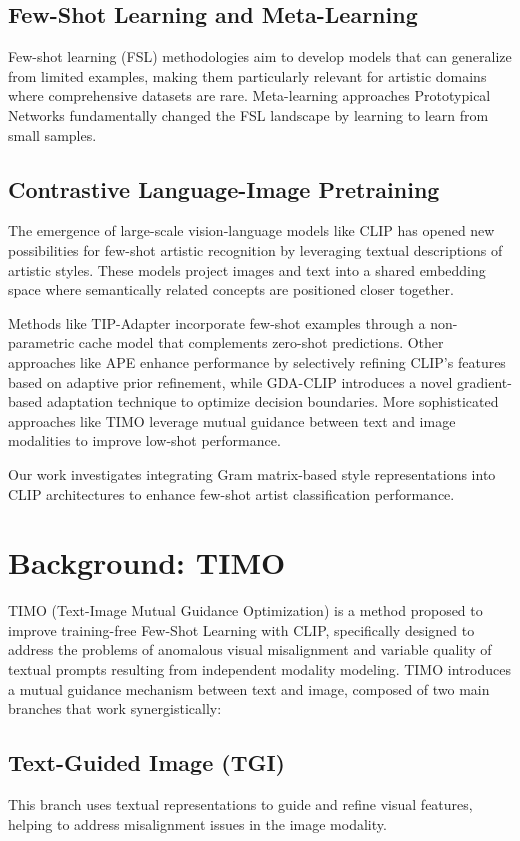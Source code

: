 \documentclass[conference,6pt]{IEEEtran}
\begin{document}
\subsection{Few-Shot Learning and Meta-Learning}
Few-shot learning (FSL) methodologies aim to develop models that can generalize from limited examples, making them particularly relevant for artistic domains where comprehensive datasets are rare. Meta-learning approaches Prototypical Networks \cite{ProtoNet}  fundamentally changed the FSL landscape by learning to learn from small samples.

\subsection{Contrastive Language-Image Pretraining}
The emergence of large-scale vision-language models like CLIP \cite{CLIP} has opened new possibilities for few-shot artistic recognition by leveraging textual descriptions of artistic styles. These models project images and text into a shared embedding space where semantically related concepts are positioned closer together. 


Methods like TIP-Adapter \cite{TipAdapter} incorporate few-shot examples through a non-parametric cache model that complements zero-shot predictions. Other approaches like APE \cite{APE} enhance performance by selectively refining CLIP's features based on adaptive prior refinement, while GDA-CLIP \cite{GDA_CLIP} introduces a novel gradient-based adaptation technique to optimize decision boundaries. More sophisticated approaches like TIMO \cite{TIMO} leverage mutual guidance between text and image modalities to improve low-shot performance.


Our work investigates integrating Gram matrix-based style representations into CLIP architectures to enhance few-shot artist classification performance.
\section{Background: TIMO}

TIMO (Text-Image Mutual Guidance Optimization) is a method proposed to improve training-free Few-Shot Learning with CLIP, specifically designed to address the problems of anomalous visual misalignment and variable quality of textual prompts resulting from independent modality modeling. TIMO introduces a mutual guidance mechanism between text and image, composed of two main branches that work synergistically:

\subsection{Text-Guided Image (TGI)}
This branch uses textual representations to guide and refine visual features, helping to address misalignment issues in the image modality.
\end{document}
